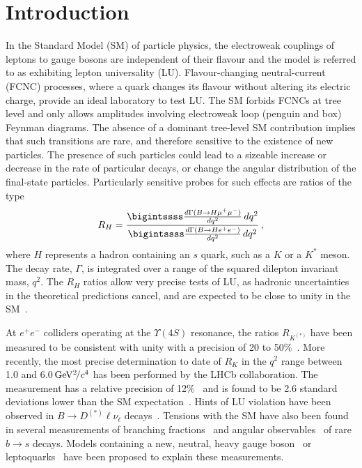 \documentclass[12pt,a4paper]{article}
\def\RK    {\mbox{R_{K}}}
\def\lhcb {\mbox{LHCb}\xspace}
\def\PUpsilon      {\ensuremath{\Upsilon}\xspace}
\def\PB      {\ensuremath{\mathrm{B}}\xspace}
\def\PD      {\ensuremath{\mathrm{D}}\xspace}
\def\PK      {\ensuremath{\mathrm{K}}\xspace}
\def\Pb      {\ensuremath{\mathrm{b}}\xspace}
\def\Pe      {\ensuremath{\mathrm{e}}\xspace}
\def\Ps      {\ensuremath{\mathrm{s}}\xspace}
\def\PB      {\ensuremath{B}\xspace}
\def\PD      {\ensuremath{D}\xspace}
\def\PK      {\ensuremath{K}\xspace}
\def\Pb      {\ensuremath{b}\xspace}
\def\Pe      {\ensuremath{e}\xspace}
\def\Ps      {\ensuremath{s}\xspace}
\def\epem       {\ensuremath{\Pe^+\Pe^-}\xspace}
\def\squark    {\ensuremath{\Ps}\xspace}
\def\bquark    {\ensuremath{\Pb}\xspace}
\def\kaon  {\ensuremath{\PK}\xspace}
\def\Kstar   {\ensuremath{\kaon^*}\xspace}
\def\D       {\ensuremath{\PD}\xspace}
\def\B       {\ensuremath{\PB}\xspace}
\newcommand{\decay}[2]{\ensuremath{#1\!\to #2}\xspace}         \def\ra                 {\ensuremath{\rightarrow}\xspace}
\def\to                 {\ensuremath{\rightarrow}\xspace}
\def\qsq       {\ensuremath{q^2}\xspace}
\newcommand{\gevgevcccc}{\ensuremath{{\mathrm{\,Ge\kern -0.1em V^2\!/}c^4}}\xspace}
\def\RH{\ensuremath{R_{H}}\xspace}
\def\RK{\ensuremath{R_{\kaon}}\xspace}
\def\RKK{\ensuremath{R_{\kaon^{(*)}}}\xspace}
\begin{document}
\cleardoublepage
 \renewcommand{\thefootnote}{\arabic{footnote}}
\setcounter{footnote}{0}
\pagestyle{plain}
\setcounter{page}{1}


\section{Introduction}

In the Standard Model (SM) of particle physics, the electroweak couplings of leptons to gauge bosons are independent of their flavour and the model is referred to as exhibiting lepton universality (LU).
Flavour-changing neutral-current (FCNC) processes, where a quark changes its flavour without altering its electric charge, provide an ideal laboratory to test LU.
The SM forbids FCNCs at tree level and only allows amplitudes involving electroweak loop (penguin and box) Feynman diagrams.
The absence of a dominant tree-level SM contribution implies that such transitions are rare, and therefore sensitive to the existence of new particles.
The presence of such particles could lead to a sizeable increase or decrease in the rate of particular decays, or change the angular distribution of the final-state particles.
Particularly sensitive probes for such effects are ratios of the type~\cite{Hiller:2003js}
\begin{eqnarray*}
\RH = \frac{\bigintssss \frac{ d\Gamma(B \to H \mumu) }{d\qsq} \, d\qsq}{\bigintssss \frac{ d\Gamma(B \to H\epem) }{d\qsq} \, d\qsq} \, ,
\end{eqnarray*}
where $H$ represents a hadron containing an \squark quark, such as a \kaon or a \Kstar meson.  
The decay rate, $\Gamma$, is integrated over a range of the squared dilepton invariant mass, \qsq. 
The \RH ratios allow very precise tests of LU, as hadronic uncertainties in the theoretical predictions cancel, and are expected to be close to unity in the SM~\cite{Hiller:2003js,Bobeth:2007dw,Bouchard:2013mia}.

At \epem colliders operating at the $\PUpsilon(4S)$ resonance, the ratios \RKK have been measured   to be consistent with unity with a precision of 20 to 50\%~\cite{Lees:2012tva,Wei:2009zv}.  
More recently, the most precise determination to date of \RK in the \qsq range between 1.0 and 6.0\gevgevcccc has been performed by the \lhcb collaboration.
The measurement has a relative precision of 12\%~\cite{LHCb-PAPER-2014-024} and is found to be 2.6 standard deviations lower than the SM expectation~\cite{Hiller:2003js}.
Hints of LU violation have been observed in \mbox{$\decay{\B}{\D^{(*)}\ell\nu_{\ell}}$} decays~\cite{Aubert:2008yv,Huschle:2015rga,LHCB-PAPER-2015-025}.
Tensions with the SM have also been found in several measurements of branching fractions~\cite{LHCb-PAPER-2014-006, LHCb-PAPER-2015-023, LHCb-PAPER-2015-009} and angular observables~\cite{LHCb-PAPER-2015-051, Wehle:2016yoi} of rare \decay{\bquark}{\squark} decays.  
Models containing a new, neutral, heavy gauge boson~\cite{Descotes-Genon:2013wba,Gauld,Buras,Altmannshofer,Altmannshofer:2014cfa,Altmannshofer:2016jzy} or leptoquarks~\cite{Becirevic:2016yqi,Crivellin:2017zlb} have been proposed to explain these measurements.
\end{document}
